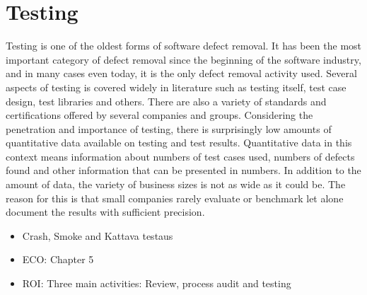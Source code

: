 
 \section{Testing}

Testing is one of the oldest forms of software defect removal. It has been the most important category of defect removal since the beginning of the software industry, and in many cases even today, it is the only defect removal activity used. Several aspects of testing is covered widely in literature such as testing itself, test case design, test libraries and others. There are also a variety of standards and certifications offered by several companies and groups. Considering the penetration and importance of testing, there is surprisingly low amounts of quantitative data available on testing and test results. Quantitative data in this context means information about numbers of test cases used, numbers of defects found and other information that can be presented in numbers. In addition to the amount of data, the variety of business sizes is not as wide as it could be. The reason for this is that small companies rarely evaluate or benchmark let alone document the results with sufficient precision.




% 




 \begin{itemize}
 
 \item Crash, Smoke and Kattava testaus
 
 \item ECO: Chapter 5

 \item ROI: Three main activities: Review, process audit and testing
 
 \end{itemize}

% 
% 
% 



